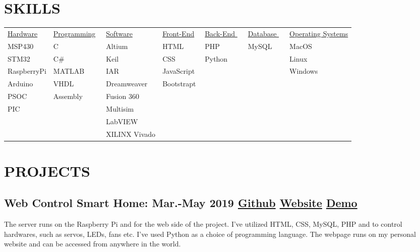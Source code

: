 \documentclass[10pt]{article}
\begin{document}
\section{SKILLS}
\begin{table}[h!]


\begin{center}
\begin{tabular}{p{6em} p{6em} p{6em} p{5em} p{5em} p{5em} p{4em} } 

 \underline{Hardware} ~ &\underline{Programming}~ & \underline{Software}~ & \underline{Front-End}~ & \underline{Back-End }  ~ & \underline{Database } ~ & \underline{Operating Systems  }   \\              
 
 MSP430 & C& Altium & HTML & PHP & MySQL & MacOS \\ 
 STM32 & C\# & Keil &CSS& Python & & Linux \\ 
 RaspberryPi & MATLAB & IAR &JavaScript & & &Windows \\ 
 Arduino & VHDL& Dreamweaver& Bootstrapt &  \\ 
  PSOC & Assembly & Fusion 360&  &  \\ 
   PIC & & Multisim& &  \\ 
      & & LabVIEW & &  \\ 
         & & XILINX Vivado & &  \\ 



\end{tabular}
\end{center}
\end{table}

\vspace{10em}
\section{PROJECTS}




\subsection{Web Control Smart Home: Mar.-May 2019 \textcolor{Mycolor3}{\href{https://github.com/Zrrck/Web-Control-Smart-Home}{\small{Github}}} \textcolor{Mycolor4}{\href{http://webtek.cetinkaya.co}{\small{Website}}}
\textcolor{Mycolor2}{\href{https://youtu.be/G7QD9RP_mmE}{\small{Demo}}}} 
The server runs on the Raspberry Pi and for the web side of the project. I've utilized HTML, CSS, MySQL, PHP and to control
hardwares, such as servos, LEDs, fans etc. I've used Python as a choice of programming language. The webpage runs on my personal website and can be accessed from anywhere in the world.
\end{document}
